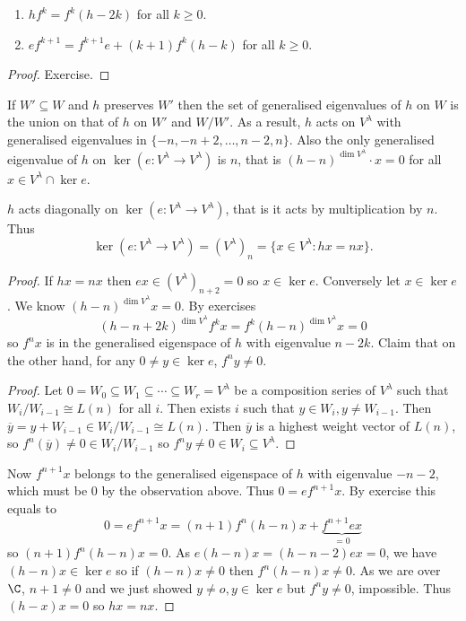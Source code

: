 \documentclass[a4paper]{article}
\begin{document}
\begin{lemma}\leavevmode
  \begin{enumerate}
  \item \(hf^k = f^k (h - 2k)\) for all \(k \geq 0\).
  \item \(ef^{k + 1} = f^{k + 1} e + (k + 1) f^k (h - k)\) for all \(k \geq 0\).
  \end{enumerate}
\end{lemma}

\begin{proof}
  Exercise.
\end{proof}

If \(W' \subseteq W\) and \(h\) preserves \(W'\) then the set of generalised eigenvalues of \(h\) on \(W\) is the union on that of \(h\) on \(W'\) and \(W/W'\). As a result, \(h\) acts on \(V^\lambda\) with generalised eigenvalues in \(\{-n, -n + 2, \dots, n - 2, n\}\). Also the only generalised eigenvalue of \(h\) on \(\ker (e: V^\lambda \to V^\lambda)\) is \(n\), that is \((h - n)^{\dim V^\lambda} \cdot x = 0\) for all \(x \in V^\lambda \cap \ker e\).

\begin{proposition}
  \(h\) acts diagonally on \(\ker (e: V^\lambda \to V^\lambda)\), that is it acts by multiplication by \(n\). Thus
  \[
    \ker (e: V^\lambda \to V^\lambda) = (V^\lambda)_n = \{x \in V^\lambda: hx = nx\}.
  \]
\end{proposition}

\begin{proof}
  If \(hx = nx\) then \(ex \in (V^\lambda)_{n + 2} = 0\) so \(x \in \ker e\). Conversely let \(x \in \ker e\). We know \((h - n)^{\dim V^\lambda} x = 0\). By exercises
  \[
    (h - n + 2k)^{\dim V^\lambda} f^kx = f^k (h - n)^{\dim V^\lambda} x = 0
  \]
  so \(f^n x\) is in the generalised eigenspace of \(h\) with eigenvalue \(n - 2k\). Claim that on the other hand, for any \(0 \neq y \in \ker e\), \(f^n y \neq 0\).
  \begin{proof}
    Let \(0 = W_0 \subseteq W_1 \subseteq \cdots \subseteq W_r = V^\lambda\) be a composition series of \(V^\lambda\) such that \(W_i/W_{i - 1} \cong L(n)\) for all \(i\). Then exists \(i\) such that \(y \in W_i, y \neq W_{i - 1}\). Then \(\overline y = y + W_{i - 1} \in W_i/W_{i - 1} \cong L(n)\). Then \(\overline y\) is a highest weight vector of \(L(n)\), so \(f^n(\overline y) \neq 0 \in W_i/W_{i - 1}\) so \(f^n y \neq 0 \in W_i \subseteq V^\lambda\).
  \end{proof}
  
  Now \(f^{n + 1}x\) belongs to the generalised eigenspace of \(h\) with eigenvalue \(-n - 2\), which must be \(0\) by the observation above. Thus \(0 = ef^{n + 1}x\). By exercise this equals to
  \[
    0 = ef^{n + 1}x = (n + 1)f^n (h - n)x + \underbrace{f^{n + 1} ex}_{= 0}
  \]
  so \((n + 1) f^n (h - n)x = 0\). As \(e(h - n)x = (h - n - 2)ex = 0\), we have \((h - n) x \in \ker e\) so if \((h - n)x \neq 0\) then \(f^n (h - n)x \neq 0\). As we are over \(\C\), \(n + 1 \neq 0\) and we just showed \(y \ne o, y \in \ker e\) but \(f^ny \neq 0\), impossible. Thus \((h - x)x = 0\) so \(hx = nx\).
\end{proof}
\end{document}
